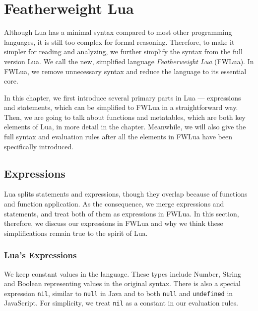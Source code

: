 \chapter{Featherweight Lua}
Although Lua has a minimal syntax compared to most other programming languages, it is still too complex for formal reasoning. Therefore, to make it simpler for reading and analyzing, we further simplify the syntax from the full version Lua. We call the new, simplified language {\it Featherweight Lua} (FWLua). In FWLua, we remove unnecessary syntax and reduce the language to its essential core.

In this chapter, we first introduce several primary parts in Lua --- expressions and statements, which can be simplified to FWLua in a straightforward way. Then, we are going to talk about functions and metatables, which are both key elements of Lua, in more detail in the chapter. Meanwhile, we will also give the full syntax and evaluation rules after all the elements in FWLua have been specifically introduced.

\section{Expressions}
Lua splits statements and expressions, though they overlap because of functions and function application. As the consequence, we merge expressions and statements, and treat both of them as expressions in FWLua. In this section, therefore, we discuss our expressions in FWLua and why we think these simplifications remain true to the spirit of Lua. 

\subsection{Lua's Expressions}

We keep constant values in the language.
These types include Number, String and Boolean representing values in the original syntax.
%
There is also a special expression {\tt nil}, similar to {\tt null} in Java and to both {\tt null} and {\tt undefined} in JavaScript.
For simplicity, we treat {\tt nil} as a constant in our evaluation rules.

